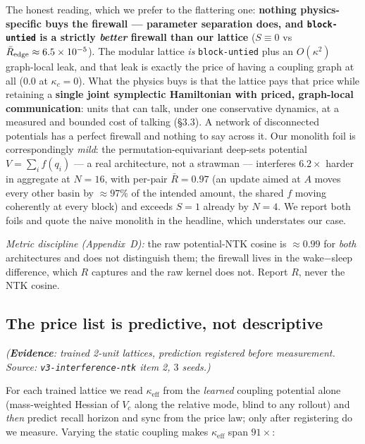 \documentclass[11pt]{article}
\newcommand{\keff}{\kappa_{\mathrm{eff}}}
\begin{document}
The honest reading, which we prefer to the flattering one: \textbf{nothing physics-specific buys the firewall --- parameter separation does, and \texttt{block-untied} is a strictly \emph{better} firewall than our lattice} ($S\equiv0$ vs $\bar R_{\rm edge}\approx6.5\times10^{-5}$). The modular lattice \emph{is} \texttt{block-untied} plus an $O(\kappa^2)$ graph-local leak, and that leak is exactly the price of having a coupling graph at all ($0.0$ at $\kappa_c=0$). What the physics buys is that the lattice pays that price while retaining a \textbf{single joint symplectic Hamiltonian with priced, graph-local communication}: units that can talk, under one conservative dynamics, at a measured and bounded cost of talking (\S3.3). A network of disconnected potentials has a perfect firewall and nothing to say across it. Our monolith foil is correspondingly \emph{mild}: the permutation-equivariant deep-sets potential $V=\sum_if(q_i)$ --- a real architecture, not a strawman --- interferes $6.2\times$ harder in aggregate at $N=16$, with per-pair $\bar R=0.97$ (an update aimed at $A$ moves every other basin by ${\approx}97\%$ of the intended amount, the shared $f$ moving coherently at every block) and exceeds $S=1$ already by $N=4$. We report both foils and quote the naive monolith in the headline, which understates our case.

\emph{Metric discipline (Appendix~D):} the raw potential-NTK cosine is $\approx0.99$ for \emph{both} architectures and does not distinguish them; the firewall lives in the wake$-$sleep difference, which $R$ captures and the raw kernel does not. Report $R$, never the NTK cosine.

\subsection{The price list is predictive, not descriptive}
\emph{(\textbf{Evidence}: trained 2-unit lattices, prediction registered before measurement. Source: \texttt{v3-interference-ntk} item 2, $3$ seeds.)}

For each trained lattice we read $\keff$ from the \emph{learned} coupling potential alone (mass-weighted Hessian of $V_c$ along the relative mode, blind to any rollout) and \emph{then} predict recall horizon and sync from the price law; only after registering do we measure. Varying the static coupling makes $\keff$ span $91\times$:
\end{document}
